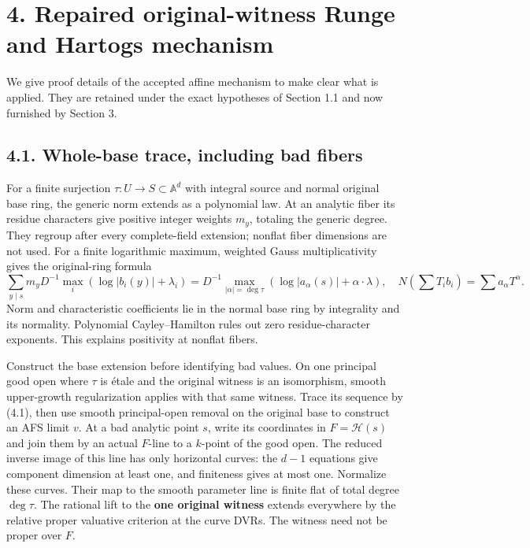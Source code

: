 \documentclass[
  10pt,
]{article}
\begin{document}
\section{4. Repaired original-witness Runge and Hartogs
mechanism}\label{repaired-original-witness-runge-and-hartogs-mechanism}

We give proof details of the accepted affine mechanism to make clear
what is applied. They are retained under the exact hypotheses of Section
1.1 and now furnished by Section 3.

\subsection{4.1. Whole-base trace, including bad
fibers}\label{whole-base-trace-including-bad-fibers}

For a finite surjection \(\tau:U\to S\subset\mathbb A^d\) with integral
source and normal original base ring, the generic norm extends as a
polynomial law. At an analytic fiber its residue characters give
positive integer weights \(m_y\), totaling the generic degree. They
regroup after every complete-field extension; nonflat fiber dimensions
are not used. For a finite logarithmic maximum, weighted Gauss
multiplicativity gives the original-ring formula \[
 \sum_{y\mid s}m_y D^{-1}\max_i(\log|b_i(y)|+\lambda_i)
 =D^{-1}\max_{|\alpha|=\deg\tau}(\log|a_\alpha(s)|+\alpha\cdot\lambda),
 \quad N(\sum T_i b_i)=\sum a_\alpha T^\alpha.
 \tag{4.1}
\] Norm and characteristic coefficients lie in the normal base ring by
integrality and its normality. Polynomial Cayley--Hamilton rules out
zero residue-character exponents. This explains positivity at nonflat
fibers.

Construct the base extension before identifying bad values. On one
principal good open where \(\tau\) is étale and the original witness is
an isomorphism, smooth upper-growth regularization applies with that
same witness. Trace its sequence by (4.1), then use smooth
principal-open removal on the original base to construct an AFS limit
\(v\). At a bad analytic point \(s\), write its coordinates in
\(F=\mathcal H(s)\) and join them by an actual \(F\)-line to a
\(k\)-point of the good open. The reduced inverse image of this line has
only horizontal curves: the \(d-1\) equations give component dimension
at least one, and finiteness gives at most one. Normalize these curves.
Their map to the smooth parameter line is finite flat of total degree
\(\deg\tau\). The rational lift to the \textbf{one original witness}
extends everywhere by the relative proper valuative criterion at the
curve DVRs. The witness need not be proper over \(F\).
\end{document}
